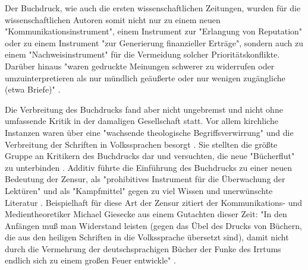Der Buchdruck, wie auch die ersten wissenschaftlichen Zeitungen, wurden für die wissenschaftlichen Autoren somit nicht nur zu einem neuen "Kommunikationsinstrument", einem Instrument zur "Erlangung von Reputation" oder zu einem Instrument "zur Generierung finanzieller Erträge", sondern auch zu einem "Nachweisinstrument" \cite{wunderlich_2008_buchdruck} \cite{schirmbacher_2009_wisspub} für die Vermeidung solcher Prioritätskonflikte. Darüber hinaus "waren gedruckte Meinungen schwerer zu widerrufen oder umzuinterpretieren als nur mündlich geäußerte oder nur wenigen zugängliche (etwa Briefe)" \cite{luhmann_1997_gesellschaft}.

Die Verbreitung des Buchdrucks fand aber nicht ungebremst und nicht ohne umfassende Kritik in der damaligen Gesellschaft statt. Vor allem kirchliche Instanzen waren über eine "wachsende theologische Begriffsverwirrung" und die Verbreitung der Schriften in Volkssprachen besorgt \cite{giesecke_1991_buchdruck}. Sie stellten die größte Gruppe an Kritikern des Buchdrucks dar und versuchten, die neue "Bücherflut" zu unterbinden \cite{giesecke_1991_buchdruck}. Additiv führte die Einführung des Buchdrucks zu einer neuen Bedeutung der Zensur, als "prohibitives Instrument für die Überwachung der Lektüren" und als "Kampfmittel" \cite{sprachgeschichte_1998_besch} gegen zu viel Wissen und unerwünschte Literatur \cite{giesecke_1991_buchdruck}. Beispielhaft für diese Art der Zensur zitiert der Kommunikations- und Medientheoretiker Michael Giesecke aus einem Gutachten dieser Zeit: "In den Anfängen muß man Widerstand leisten (gegen das Übel des Drucks von Büchern, die aus den heiligen Schriften in die Volkssprache übersetzt sind), damit nicht durch die Vermehrung der deutschsprachigen Bücher der Funke des Irrtums endlich sich zu einem großen Feuer entwickle" \cite{giesecke_1991_buchdruck}.

